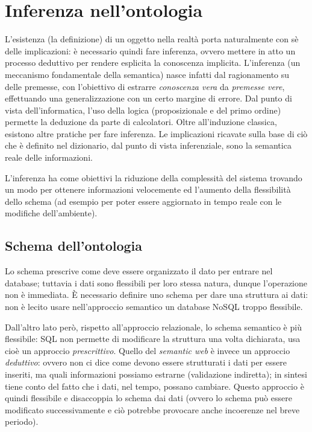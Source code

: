 \documentclass[11pt]{article}
\begin{document}
\section{Inferenza nell'ontologia}
L'esistenza (la definizione) di un oggetto nella realtà porta naturalmente con sè delle implicazioni: è necessario quindi fare inferenza, ovvero mettere in atto un processo deduttivo per rendere esplicita la conoscenza implicita. L'inferenza (un meccanismo fondamentale della semantica) nasce infatti dal ragionamento su delle premesse, con l'obiettivo di estrarre \textit{conoscenza vera} da \textit{premesse vere}, effettuando una generalizzazione con un certo margine di errore.
Dal punto di vista dell'informatica, l'uso della logica (proposizionale e del primo ordine) permette la deduzione da parte di calcolatori.
Oltre all'induzione classica, esistono altre pratiche per fare inferenza.
Le implicazioni ricavate sulla base di ciò che è definito nel dizionario, dal punto di vista inferenziale, sono la semantica reale delle informazioni.

L'inferenza ha come obiettivi la riduzione della complessità del sistema trovando un modo per ottenere informazioni velocemente ed l'aumento della flessibilità dello schema (ad esempio per poter essere aggiornato in tempo reale con le modifiche dell'ambiente).

\subsection{Schema dell'ontologia}
Lo schema prescrive come deve essere organizzato il dato per entrare nel database; tuttavia i dati sono flessibili per loro stessa natura, dunque l'operazione non è immediata.
È necessario definire uno schema per dare una struttura ai dati: non è lecito usare nell'approccio semantico un database NoSQL troppo flessibile.

Dall'altro lato però, rispetto all'approccio relazionale, lo schema semantico è più flessibile: SQL non permette di modificare la struttura una volta dichiarata, usa cioè un approccio \textit{prescrittivo}.
Quello del \textit{semantic web} è invece un approccio \textit{deduttivo}: ovvero non ci dice come devono essere strutturati i dati per essere inseriti, ma quali informazioni possiamo estrarne (validazione indiretta); in sintesi tiene conto del fatto che i dati, nel tempo, possano cambiare.
Questo approccio è quindi flessibile e disaccoppia lo schema dai dati (ovvero lo schema può essere modificato successivamente e ciò potrebbe provocare anche incoerenze nel breve periodo).
\end{document}

